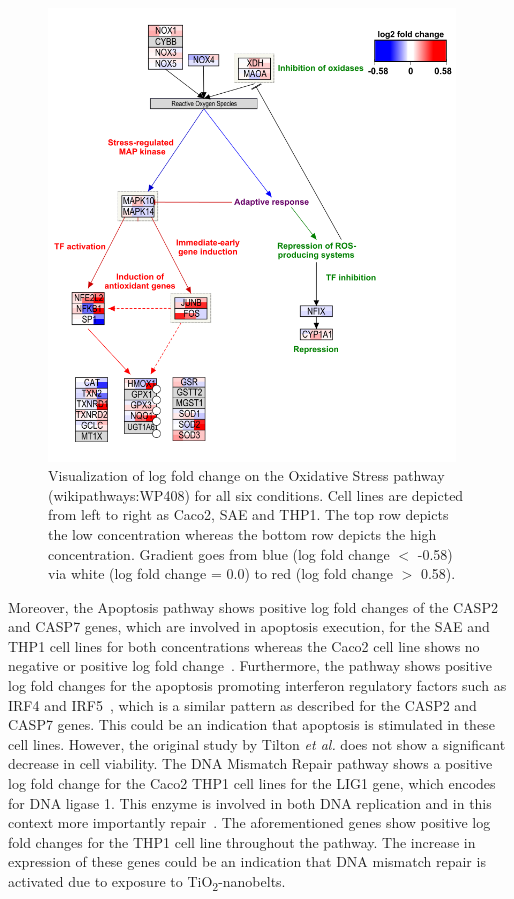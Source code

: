 \documentclass[ijms,article,submit,moreauthors,pdftex]{Definitions/mdpi}
\begin{document}
\begin{figure}[ht!]
\includegraphics[height=12cm,keepaspectratio]{fig3.png}
  \caption{Visualization of log fold change on the Oxidative Stress pathway (wikipathways:WP408) for all six conditions.
   Cell lines are depicted from left to right as Caco2, SAE and THP1. The top row depicts the low concentration whereas the bottom row depicts the high concentration. Gradient goes from blue (log fold change $<$ -0.58) via white (log fold change = 0.0) to red (log fold change $>$ 0.58).
}
\label{fig:fig3}
\end{figure}

Moreover, the Apoptosis pathway shows positive log fold changes of the CASP2 and CASP7 genes, which are involved in apoptosis execution, for the SAE and THP1 cell lines for both concentrations whereas the Caco2 cell line shows no negative or positive log fold change~\cite{BouchierHayes2011,Lamkanfi2010}. Furthermore, the pathway shows positive log fold changes for the apoptosis promoting interferon regulatory factors such as IRF4 and IRF5~\cite{Stang2007,Fanzo2003,Hu2009}, which is a similar pattern as described for the CASP2 and CASP7 genes. This could be an indication that apoptosis is stimulated in these cell lines. However, the original study by Tilton \textit{et al.} does not show a significant decrease in cell viability. 
The DNA Mismatch Repair pathway shows a positive log fold change for the Caco2 THP1 cell lines for the LIG1 gene, which encodes for DNA ligase 1. This enzyme is involved in both DNA replication and in this context more importantly repair~\cite{Mota2019}. The aforementioned genes show positive log fold changes for the THP1 cell line throughout the pathway. The increase in expression of these genes could be an indication that DNA mismatch repair is activated due to exposure to TiO\textsubscript{2}-nanobelts.
\end{document}

